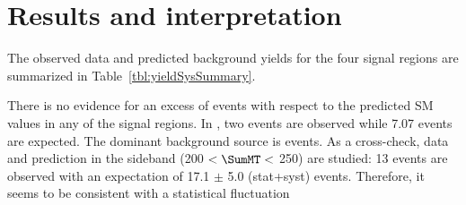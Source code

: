 \section{Results and interpretation}
\label{sect:stat}
The observed data and predicted background yields for the four signal regions are summarized in Table~\ref{tbl:yieldSysSummary}. 

There is no evidence for an excess of events with respect to the predicted SM values in any of the signal regions. In \bintwo, two events are observed while 7.07 events are expected. The dominant background source is \wjets events. As a cross-check, data and prediction in the sideband (200 $< \SumMT <$ 250\GeV) are studied: 13 events are observed with an expectation of 17.1 $\pm$ 5.0 (stat+syst) events. 
Therefore, it seems to be consistent with a statistical fluctuation

